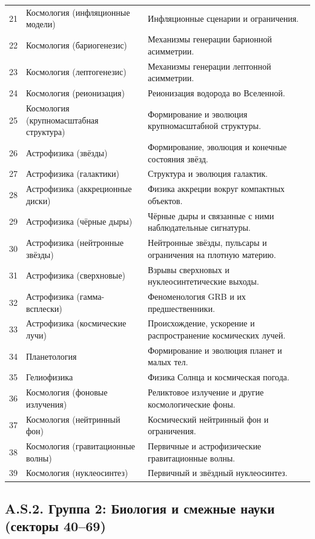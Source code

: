 \documentclass[11pt,a4paper]{article}
\begin{document}
\begin{longtable}{|p{0.9cm}|p{6.0cm}|p{8.6cm}|}
		21 & Космология (инфляционные модели) & Инфляционные сценарии и ограничения. \\
		22 & Космология (бариогенезис) & Механизмы генерации барионной асимметрии. \\
		23 & Космология (лептогенезис) & Механизмы генерации лептонной асимметрии. \\
		24 & Космология (реионизация) & Реионизация водорода во Вселенной. \\
		25 & Космология (крупномасштабная структура) & Формирование и эволюция крупномасштабной структуры. \\
		26 & Астрофизика (звёзды) & Формирование, эволюция и конечные состояния звёзд. \\
		27 & Астрофизика (галактики) & Структура и эволюция галактик. \\
		28 & Астрофизика (аккреционные диски) & Физика аккреции вокруг компактных объектов. \\
		29 & Астрофизика (чёрные дыры) & Чёрные дыры и связанные с ними наблюдательные сигнатуры. \\
		30 & Астрофизика (нейтронные звёзды) & Нейтронные звёзды, пульсары и ограничения на плотную материю. \\
		31 & Астрофизика (сверхновые) & Взрывы сверхновых и нуклеосинтетические выходы. \\
		32 & Астрофизика (гамма-всплески) & Феноменология GRB и их предшественники. \\
		33 & Астрофизика (космические лучи) & Происхождение, ускорение и распространение космических лучей. \\
		34 & Планетология & Формирование и эволюция планет и малых тел. \\
		35 & Гелиофизика & Физика Солнца и космическая погода. \\
		36 & Космология (фоновые излучения) & Реликтовое излучение и другие космологические фоны. \\
		37 & Космология (нейтринный фон) & Космический нейтринный фон и ограничения. \\
		38 & Космология (гравитационные волны) & Первичные и астрофизические гравитационные волны. \\
		39 & Космология (нуклеосинтез) & Первичный и звёздный нуклеосинтез. \\
	\end{longtable}
	
	\subsection*{A.S.2. Группа 2: Биология и смежные науки (секторы 40--69)}
	
\end{document}
